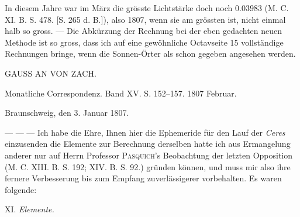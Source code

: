 \par\indent In diesem Jahre war im März die grösste Lichtstärke doch noch $0.03983$ (M. C. XI. B. S. 478. [S. 265
d. B.]), also 1807, wenn sie am grössten ist, nicht einmal halb so gross. --- Die Abkürzung der Rechnung bei der eben gedachten neuen Methode ist so gross, dass ich auf eine gewöhnliche Octavseite 15
vollständige Rechnungen bringe, wenn die Sonnen-Örter als schon gegeben angesehen werden.

\par{}

\begin{center}
GAUSS AN VON ZACH.
\end{center}

\begin{center}
Monatliche Correspondenz. Band XV. S. 152–157. 1807 Februar.
\end{center}

\begin{flushright}
Braunschweig, den 3. Januar 1807.
\end{flushright}

\par\indent --- --- --- Ich habe die Ehre, Ihnen hier die Ephemeride für den Lauf der \emph{Ceres} einzusenden
die Elemente zur Berechnung derselben hatte ich aus Ermangelung anderer nur auf Herrn Professor
%
\textsc{Pasquich}'s Beobachtung der letzten Opposition (M. C. XIII. B. S. 192; XIV. B. S. 92.) gründen
können, und muss mir also ihre fernere Verbesserung bis zum Empfang zuverlässigerer vorbehalten.
Es waren folgende:

\begin{center}
XI. \emph{Elemente.}
\end{center}

